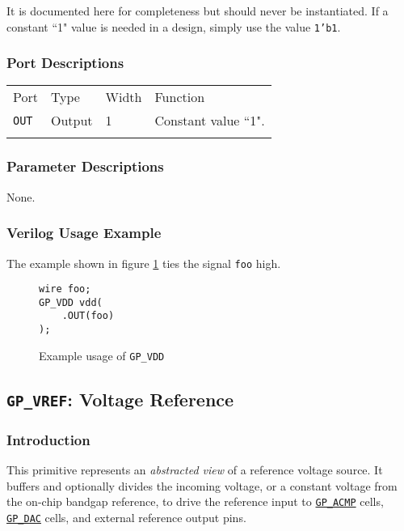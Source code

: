 \documentclass[11pt]{article}
\newcommand{\tokenstyle}[1]{\texttt{#1}}
\newcommand{\wirestyle}[1]{\texttt{#1}}
\newcommand{\datastyle}[1]{\texttt{#1}}
\newcommand{\whenstyle}[1]{{\fontseries{sb}\selectfont#1}}
\newcommand{\tokenref}[2]{\hyperref[#2]{\tokenstyle{#1}}}
\newcommand{\thinhline}{\Xhline{1\arrayrulewidth}}
\newcommand{\thickhline}{\Xhline{2.5\arrayrulewidth}}
\begin{document}
It is documented here for completeness but should never be instantiated. If a constant ``1" value is needed in a
design, simply use the value \datastyle{1'b1}.

\subsubsection{Port Descriptions}

\begin{tabularx}{\textwidth}{lllX}
\thinhline
\whenstyle{Port} & \whenstyle{Type} & \whenstyle{Width} & \whenstyle{Function} \\
\thickhline
\tokenstyle{OUT} & Output & 1 & Constant value ``1". \\
\thinhline
\end{tabularx}

\subsubsection{Parameter Descriptions}

None.

\subsubsection{Verilog Usage Example}

The example shown in figure \ref{gp-vdd-example} ties the signal \wirestyle{foo} high.

\begin{figure}[h]
\begin{lstlisting}
wire foo;
GP_VDD vdd(
	.OUT(foo)
);
\end{lstlisting}
\caption{Example usage of \tokenstyle{GP\_VDD}}
\label{gp-vdd-example}
\end{figure}


\pagebreak
\subsection{\tokenstyle{GP\_VREF}: Voltage Reference}
\label{gp-vref}

\subsubsection{Introduction}
This primitive represents an \textit{abstracted view} of a reference voltage source. It buffers and optionally divides
the incoming voltage, or a constant voltage from the on-chip bandgap reference, to drive the reference input to
\tokenref{GP\_ACMP}{gp-acmp} cells, \tokenref{GP\_DAC}{gp-dac} cells, and external reference output pins.
\end{document}
